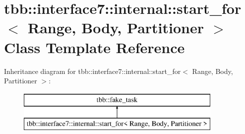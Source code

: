 \hypertarget{classtbb_1_1interface7_1_1internal_1_1start__for}{}\section{tbb\+:\+:interface7\+:\+:internal\+:\+:start\+\_\+for$<$ Range, Body, Partitioner $>$ Class Template Reference}
\label{classtbb_1_1interface7_1_1internal_1_1start__for}
Inheritance diagram for tbb\+:\+:interface7\+:\+:internal\+:\+:start\+\_\+for$<$ Range, Body, Partitioner $>$\+:\begin{figure}[H]
\begin{center}
\leavevmode
\includegraphics[height=2.000000cm]{classtbb_1_1interface7_1_1internal_1_1start__for}
\end{center}
\end{figure}
